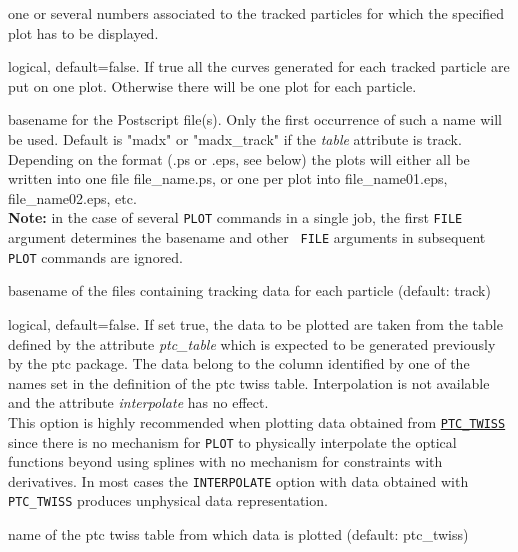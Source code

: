 \begin{madlist}
    one or several numbers associated to the tracked
     particles for which the specified plot has to be displayed.  

    logical, default=false. If true all the curves
     generated for each tracked particle are put on one plot. Otherwise
     there will be one plot for each particle.   

    basename for the Postscript
     file(s). Only the first occurrence of such a name will be
     used. Default is "madx" or "madx\_track" if the \textit{table}
     attribute is track.  Depending on the format (.ps or .eps, see
     below) the plots will either all be written into one file
     file\_name.ps, or one per plot into file\_name01.eps,
     file\_name02.eps, etc. \\
     {\bf Note:} in the case of several {\tt PLOT} commands in a single \madx 
     job, the first {\tt FILE} argument determines the basename and other {\tt 
     FILE} arguments in subsequent {\tt PLOT} commands are ignored.

    basename of the files containing
     tracking data for each particle (default: track)  

    logical, default=false. If set true, the data to be
     plotted are taken from the table defined by the attribute
     \textit{ptc\_table} which is expected to be generated previously by
     the ptc package. The data belong to the column identified by one of
     the names set in the definition of the ptc twiss
     table. Interpolation is not available and the attribute
     \textit{interpolate} has no effect. \\ 
     This option is highly recommended when plotting data obtained from
     \hyperref[chap:ptc-twiss]{\tt PTC\_TWISS} since there is no
     mechanism for {\tt PLOT} to physically interpolate the optical
     functions beyond using splines with no mechanism for constraints
     with derivatives. In most cases the {\tt INTERPOLATE} option with
     data obtained with {\tt PTC\_TWISS} produces unphysical data
     representation.

    name of the ptc twiss table from which data is
     plotted (default: ptc\_twiss)

\end{madlist}



